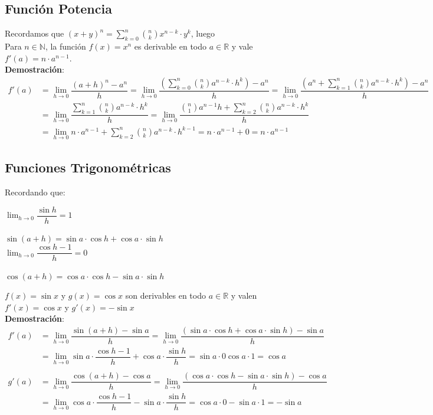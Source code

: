 \documentclass[11pt,a4paper]{article}
\begin{document}
\subsection{Funci\'on Potencia}
Recordamos que $(x+y)^n = \displaystyle{\sum_{k=0}^n \binom{n}{k} x^{n-k}\cdot y^k}$, luego\\
Para $n \in \mathbb{N}$, la funci\'on $f(x)=x^n$ es derivable en todo $a \in \mathbb{R}$ y vale $f'(a)=n\cdot a^{n-1}$.\\
\textbf{Demostraci\'on}:
\begin{align*}
f'(a) &= \lim_{h \to 0}\dfrac{(a+h)^n - a^n}{h} = \lim_{h\to 0}\dfrac{\left(\sum_{k=0}^n \binom{n}{k} a^{n-k}\cdot h^k\right) - a^n}{h} = \lim_{h\to 0}\dfrac{\left(a^n + \sum_{k=1}^n \binom{n}{k} a^{n-k}\cdot h^k\right) - a^n}{h} \\ &= \lim_{h\to 0}\dfrac{\sum_{k=1}^n \binom{n}{k} a^{n-k}\cdot h^k}{h} = \lim_{h\to 0}\dfrac{\binom{n}{1}a^{n-1}h + \sum_{k=2}^n \binom{n}{k} a^{n-k}\cdot h^k}{h} \\ &= \lim_{h\to 0}n\cdot a^{n-1} + \sum_{k=2}^n \binom{n}{k} a^{n-k}\cdot h^{k-1} = n\cdot a^{n-1} + 0 = n\cdot a^{n-1}
\end{align*}

\subsection{Funciones Trigonom\'etricas}
Recordando que:
\begin{multicols}{2}
\indent \indent \indent \indent $\displaystyle{\lim_{h \to 0} \dfrac{\sin h}{h} = 1}$ \\  \\
$\sin(a+h) = \sin a \cdot \cos h + \cos a \cdot \sin h$ \\ 
\indent \indent \indent \indent $\displaystyle{\lim_{h \to 0} \dfrac{\cos h - 1}{h} = 0}$ \\ \\ 
$\cos(a+h) = \cos a \cdot \cos h - \sin a \cdot \sin h$
\end{multicols}
$f(x)=\sin x$ y $g(x)=\cos x$ son derivables en todo $a\in\mathbb{R}$ y valen $f'(x)=\cos x$ y $g'(x)=-\sin x$\\
\textbf{Demostraci\'on}: 
\begin{align*}
f'(a) &= \displaystyle{\lim_{h \to 0} \dfrac{\sin(a+h) - \sin a}{h} = \lim_{h \to 0} \dfrac{(\sin a \cdot \cos h + \cos a \cdot \sin h) - \sin a}{h}} \\ &= \displaystyle{\lim_{h \to 0} \sin a \cdot \dfrac{\cos h - 1}{h} + \cos a \cdot \dfrac{\sin h}{h} = \sin a \cdot 0 \cos a \cdot 1} = \cos a\\ \\
g'(a) &= \displaystyle{\lim_{h \to 0} \dfrac{\cos(a+h)-\cos a}{h} = \lim_{h \to 0} \dfrac{(\cos a \cdot \cos h - \sin a \cdot \sin h)-\cos a}{h}} \\ &= \displaystyle{\lim_{h \to 0} \cos a \cdot \dfrac{\cos h - 1}{h} - \sin a \cdot \dfrac{\sin h}{h} = \cos a \cdot 0 - \sin a \cdot 1 = -\sin a}
\end{align*}
\end{document}
